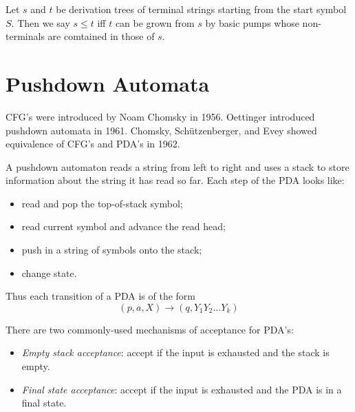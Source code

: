 \begin{definition} \label{def:cfg:tree:order}
    Let $s$ and $t$ be derivation trees of terminal strings starting from
    the start symbol $S$.
    Then we say $s \le t$ iff $t$ can be grown from $s$ by basic pumps
    whose non-terminals are comtained in those of $s$.
\end{definition}

\section{Pushdown Automata} \label{sec:pda}
CFG's were introduced by Noam Chomsky in 1956.
Oettinger introduced pushdown automata in 1961.
Chomsky, Schützenberger, and Evey showed equivalence of CFG's and PDA's in 1962.

A pushdown automaton reads a string from left to right and uses a stack to
store information about the string it has read so far.
Each step of the PDA looks like:
\begin{itemize}
    \item read and pop the top-of-stack symbol;
    \item read current symbol and advance the read head;
    \item push in a string of symbols onto the stack;
    \item change state.
\end{itemize}
Thus each transition of a PDA is of the form \[
    (p, a, X) \to (q, Y_1 Y_2 \dots Y_k)
\]

There are two commonly-used mechanisms of acceptance for PDA's:
\begin{itemize}
    \item \emph{Empty stack acceptance}: accept if the input is exhausted
        and the stack is empty.
    \item \emph{Final state acceptance}: accept if the input is exhausted
        and the PDA is in a final state.
\end{itemize}

